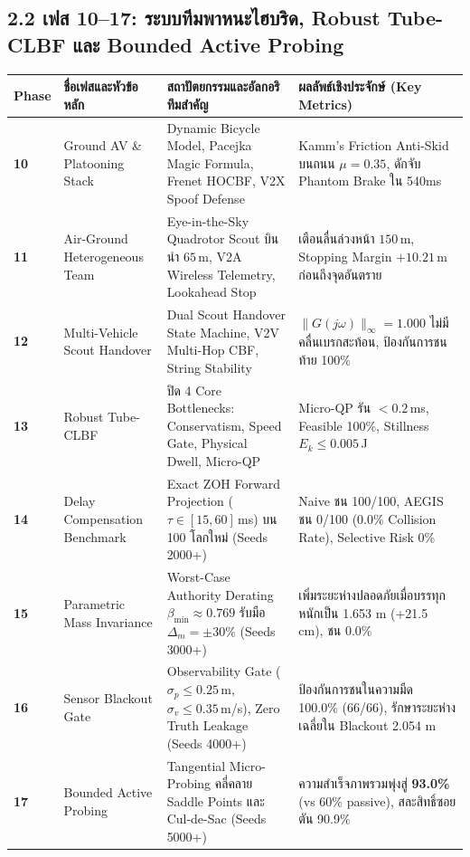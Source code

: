 \documentclass[10pt,a4paper]{article}
\begin{document}
\vspace{3pt}
\subsection*{\normalsize 2.2 เฟส 10--17: ระบบทีมพาหนะไฮบริด, Robust Tube-CLBF และ Bounded Active Probing}
\vspace{-3pt}

\begin{center}
\footnotesize
\begin{tabularx}{\textwidth}{>{\centering\arraybackslash}p{0.6cm} >{\raggedright\arraybackslash}p{3.2cm} >{\raggedright\arraybackslash}X >{\raggedright\arraybackslash}p{4.7cm}}
\toprule
\textbf{Phase} & \textbf{ชื่อเฟสและหัวข้อหลัก} & \textbf{สถาปัตยกรรมและอัลกอริทึมสำคัญ} & \textbf{ผลลัพธ์เชิงประจักษ์ (Key Metrics)} \\
\midrule
\textbf{10} & Ground AV \& Platooning Stack & Dynamic Bicycle Model, Pacejka Magic Formula, Frenet HOCBF, V2X Spoof Defense & Kamm's Friction Anti-Skid บนถนน $\mu=0.35$, ดักจับ Phantom Brake ใน 540ms \\
\textbf{11} & Air-Ground Heterogeneous Team & Eye-in-the-Sky Quadrotor Scout บินนำ $65\,$m, V2A Wireless Telemetry, Lookahead Stop & เตือนลื่นล่วงหน้า $150\,$m, Stopping Margin $+10.21\,$m ก่อนถึงจุดอันตราย \\
\textbf{12} & Multi-Vehicle Scout Handover & Dual Scout Handover State Machine, V2V Multi-Hop CBF, String Stability & $\|G(j\omega)\|_\infty = 1.000$ ไม่มีคลื่นเบรกสะท้อน, ป้องกันการชนท้าย 100\% \\
\textbf{13} & Robust Tube-CLBF & ปิด 4 Core Bottlenecks: Conservatism, Speed Gate, Physical Dwell, Micro-QP & Micro-QP รัน $<0.2\,$ms, Feasible 100\%, Stillness $E_k \le 0.005\,$J \\
\textbf{14} & Delay Compensation Benchmark & Exact ZOH Forward Projection ($\tau \in [15, 60]\,$ms) บน 100 โลกใหม่ (Seeds 2000+) & Naive ชน 100/100, AEGIS ชน 0/100 (0.0\% Collision Rate), Selective Risk 0\% \\
\textbf{15} & Parametric Mass Invariance & Worst-Case Authority Derating $\beta_{\min} \approx 0.769$ รับมือ $\Delta_m = \pm 30\%$ (Seeds 3000+) & เพิ่มระยะห่างปลอดภัยเมื่อบรรทุกหนักเป็น 1.653 m (+21.5 cm), ชน 0.0\% \\
\textbf{16} & Sensor Blackout Gate & Observability Gate ($\sigma_p \le 0.25\,$m, $\sigma_v \le 0.35\,$m/s), Zero Truth Leakage (Seeds 4000+) & ป้องกันการชนในความมืด 100.0\% (66/66), รักษาระยะห่างเฉลี่ยใน Blackout 2.054 m \\
\textbf{17} & Bounded Active Probing & Tangential Micro-Probing คลี่คลาย Saddle Points และ Cul-de-Sac (Seeds 5000+) & ความสำเร็จภาพรวมพุ่งสู่ \textbf{93.0\%} (vs 60\% passive), สละสิทธิ์ซอยตัน 90.9\% \\
\bottomrule
\end{tabularx}
\end{center}
\end{document}
